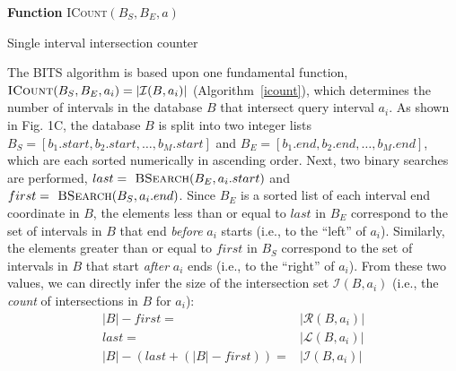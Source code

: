 \documentclass{bioinfo}
\begin{document}
\begin{algorithm}[h]
	\DontPrintSemicolon
	\footnotesize
	\BlankLine
	\textbf{Function} \textsc{ICount}$(B_S,B_E,a)$
	\caption{Single interval intersection counter}
	\label{icount}
\end{algorithm}

The BITS algorithm is based upon one fundamental function,
$\textsc{ICount}(B_S,B_E,a_i) = |\mathcal{I}(B,a_i)|$ (Algorithm~\ref{icount}),
which determines the number of intervals in the database $B$ that intersect 
query interval $a_i$.  As shown in Fig. 1C, the database $B$ is split into two 
integer lists $B_S = [b_1.start, b_2.start, \dots, b_M.start]$ and $B_E = 
[b_1.end, b_2.end, \dots, b_M.end]$, which are each sorted numerically in 
ascending order.  Next, two binary searches are performed, 
$last=\textsc{ BSearch}(B_E, a_i.start)$ and 
$first=\textsc{ BSearch}(B_S, a_i.end)$.  Since $B_E$ is a sorted list of each
interval end coordinate in $B$, the elements less than or equal to $last$ in
$B_E$ correspond to the set of intervals in $B$ that end \emph{before} $a_i$
starts (i.e., to the ``left'' of $a_i$).  Similarly, the elements greater than
or equal to $first$ in $B_S$ correspond to the set of intervals in $B$ that
start \emph{after} $a_i$ ends (i.e., to the ``right'' of $a_i$).  From these two
values, we can directly infer the size of the intersection set
$\mathcal{I}(B,a_i)$ (i.e., the \emph{count} of intersections in $B$ for $a_i$):
\vspace{-.75em}
\begin{equation*}
	\begin{split}
		|B|-first=&|\mathcal{R}(B,a_i)| \\
		last=&|\mathcal{L}(B,a_i)| \\ 
		|B|-(last+(|B|-first))=&|\mathcal{I}(B,a_i)|
	\end{split}
\end{equation*}

\end{document}
